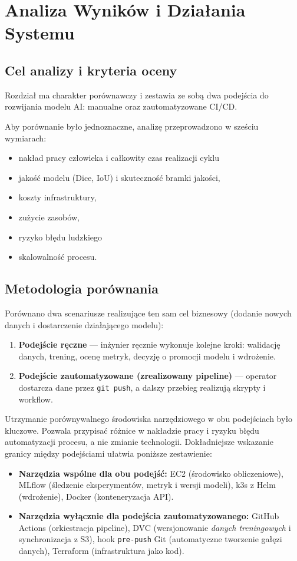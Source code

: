 \section{Analiza Wyników i Działania Systemu}
\label{sec:Analiza_wynikow}

\subsection{Cel analizy i kryteria oceny}

Rozdział ma charakter porównawczy i zestawia ze sobą dwa podejścia do rozwijania modelu AI: manualne oraz zautomatyzowane CI/CD.

Aby porównanie było jednoznaczne, analizę przeprowadzono w sześciu wymiarach:
\begin{itemize}
  \item nakład pracy człowieka i całkowity czas realizacji cyklu
  \item jakość modelu (Dice, IoU) i skuteczność bramki jakości,
  \item koszty infrastruktury,
  \item zużycie zasobów,
  \item ryzyko błędu ludzkiego
  \item skalowalność procesu.
\end{itemize}

\subsection{Metodologia porównania}

Porównano dwa scenariusze realizujące ten sam cel biznesowy (dodanie nowych danych i dostarczenie działającego modelu):
\begin{enumerate}
  \item \textbf{Podejście ręczne} --- inżynier ręcznie wykonuje kolejne kroki: walidację danych, trening, ocenę metryk, decyzję o promocji modelu i wdrożenie.
  \item \textbf{Podejście zautomatyzowane (zrealizowany pipeline)} --- operator dostarcza dane przez \texttt{git push}, a dalszy przebieg realizują skrypty i workflow.
\end{enumerate}

Utrzymanie porównywalnego środowiska narzędziowego w obu podejściach było kluczowe. Pozwala przypisać różnice w nakładzie pracy i ryzyku błędu automatyzacji procesu, a nie zmianie technologii. Dokładniejsze wskazanie granicy między podejściami ułatwia poniższe zestawienie:
\begin{itemize}
  \item \textbf{Narzędzia wspólne dla obu podejść:} EC2 (środowisko obliczeniowe), MLflow (śledzenie eksperymentów, metryk i wersji modeli), k3s z Helm (wdrożenie), Docker (konteneryzacja API).
  \item \textbf{Narzędzia wyłącznie dla podejścia zautomatyzowanego:} GitHub Actions (orkiestracja pipeline), DVC (wersjonowanie \textit{danych treningowych} i synchronizacja z S3), hook \texttt{pre-push} Git (automatyczne tworzenie gałęzi danych), Terraform (infrastruktura jako kod).
\end{itemize}

